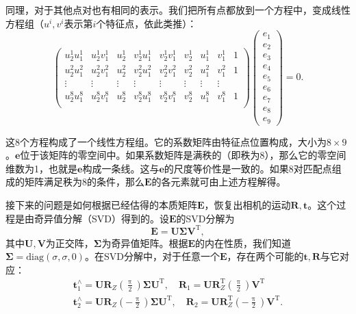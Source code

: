 同理，对于其他点对也有相同的表示。我们把所有点都放到一个方程中，变成线性方程组（$u^i, v^i$表示第$i$个特征点，依此类推）：
\begin{equation}
\label{Eq:eight-point}
\begin{pmatrix}
u_{2}^{1}u_{1}^{1}& u_{2}^{1}v_{1}^{1}& u_{2}^{1}& v_{2}^{1}u_{1}^{1}& v_{2}^{1}v_{1}^{1}& v_{2}^{1} &u_{1}^{1} &v_{1}^{1}&1\\
u_{2}^{2}u_{1}^{2}& u_{2}^{2}v_{1}^{2}& u_{2}^{2}& v_{2}^{2}u_{1}^{2}& v_{2}^{2}v_{1}^{2}& v_{2}^{2} &u_{1}^{2} &v_{1}^{2}&1\\
\vdots & \vdots & \vdots & \vdots & \vdots & \vdots & \vdots & \vdots \\
u_{2}^{8}u_{1}^{8}& u_{2}^{8}v_{1}^{8}& u_{2}^{8}& v_{2}^{8}u_{1}^{8}& v_{2}^{8}v_{1}^{8}& v_{2}^{8} &u_{1}^{8}&v_{1}^{8}&1\\
\end{pmatrix}
\begin{pmatrix}
e_{1}\\ e_{2}\\ e_{3}\\  e_{4}\\ e_{5}\\ e_{6}\\ e_{7}\\ e_{8}\\ e_{9}  
\end{pmatrix}
=0.
\end{equation}

这8个方程构成了一个线性方程组。它的系数矩阵由特征点位置构成，大小为$8 \times 9$。$\bm{e}$位于该矩阵的零空间中。如果系数矩阵是满秩的（即秩为8），那么它的零空间维数为1，也就是$\bm{e}$构成一条线。这与$\bm{e}$的尺度等价性是一致的。如果8对匹配点组成的矩阵满足秩为8的条件，那么$\bm{E}$的各元素就可由上述方程解得。

接下来的问题是如何根据已经估得的本质矩阵$\bm{E}$，恢复出相机的运动$\bm{R}, \bm{t}$。这个过程是由奇异值分解（SVD）得到的。设$\bm{E}$的SVD分解为
\begin{equation}
\bm{E} = \bm{U} \bm{\Sigma} \bm{V}^\mathrm{T},
\end{equation}
其中$\bm{U}, \bm{V}$为正交阵，$\bm{\Sigma}$为奇异值矩阵。根据$\bm{E}$的内在性质，我们知道$\bm{\Sigma} = \mathrm{diag}( \sigma, \sigma, 0 )$。在SVD分解中，对于任意一个$\bm{E}$，存在两个可能的$\bm{t}, \bm{R}$与它对应：
\begin{equation}
\begin{array}{l}
\bm{t}_1^ \wedge  = \bm{U}{\bm{R}_Z}(\frac{\uppi }{2}) \bm{\Sigma} {\bm{U}^\mathrm{T}}, \quad {\bm{R}_1} = \bm{U} \bm{R}_Z^\mathrm{T}(\frac{\uppi }{2}){ \bm{V}^\mathrm{T}}\\
\bm{t}_2^ \wedge  = \bm{U}{\bm{R}_Z}( - \frac{\uppi }{2})\bm{\Sigma} {\bm{U}^\mathrm{T}}, \quad  {\bm{R}_2} = \bm{U} \bm{R}_Z^\mathrm{T}( - \frac{\uppi }{2}){\bm{V}^\mathrm{T}}.
\end{array}
\end{equation}

